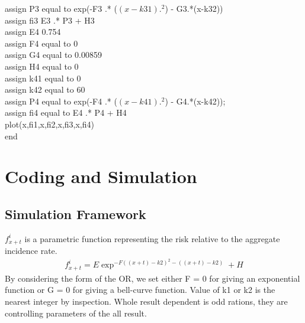 \documentclass{article}
\begin{document}
\begin{itemize}
assign P3 equal to exp(-F3 .* ($(x-k31).^2$) - G3.*(x-k32))\\
assign fi3  E3 .* P3 + H3 \\
assign E4 0.754 \\
assign F4 equal to 0\\
assign G4 equal to 0.00859 \\
assign H4 equal to 0\\
assign k41 equal to 0 \\
assign k42 equal to 60 \\
assign P4 equal to exp(-F4 .* ($(x-k41).^2$) - G4.*(x-k42));\\
assign fi4 equal to E4 .* P4 + H4 \\
plot(x,fi1,x,fi2,x,fi3,x,fi4)\\
end\\
\end{itemize}
\section{Coding and Simulation} 
\subsection{Simulation Framework}
$f_{x+t}^{i}$ is a parametric function representing the risk relative to the aggregate incidence rate.
\begin{align*}
 f_{x+t}^{i} = E \exp^{-F((x+t)-k2)^2 -((x+t)-k2)}+H   
\end{align*}
\newline
By considering the form of the OR, we set either F = 0 for giving an exponential function or G = 0  for giving a bell-curve function.
\newline
Value of k1 or k2 is the nearest integer by inspection.
\newline
Whole result dependent is odd rations, they are controlling parameters of the all result.

\newpage
\end{document}
